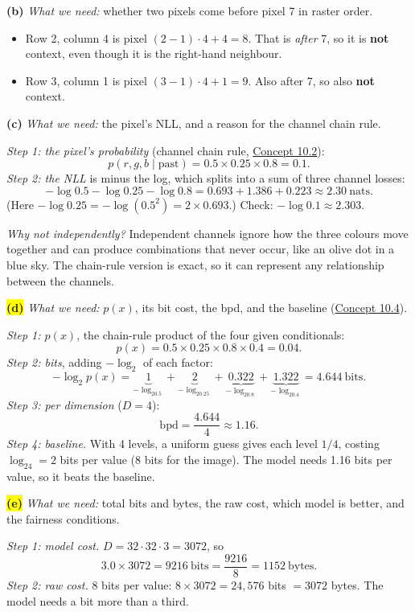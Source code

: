 \documentclass[12pt,a4paper]{article}
\begin{document}
\textbf{(b)} \emph{What we need:} whether two pixels come before pixel 7 in raster order.
\begin{itemize}[nosep]
  \item Row 2, column 4 is pixel $(2-1)\cdot4+4=8$. That is \emph{after} 7, so it is \textbf{not} context, even though it is the right-hand neighbour.
  \item Row 3, column 1 is pixel $(3-1)\cdot4+1=9$. Also after 7, so also \textbf{not} context.
\end{itemize}

\textbf{(c)} \emph{What we need:} the pixel's NLL, and a reason for the channel chain rule.

\emph{Step 1: the pixel's probability} (channel chain rule, \hyperref[c10-2]{Concept 10.2}):
\[
p(r,g,b\mid\text{past})=0.5\times0.25\times0.8=0.1 .
\]
\emph{Step 2: the NLL} is minus the log, which splits into a sum of three channel losses:
\[
-\log0.5-\log0.25-\log0.8=0.693+1.386+0.223\approx2.30\ \text{nats}.
\]
(Here $-\log0.25=-\log(0.5^2)=2\times0.693$.) Check: $-\log0.1\approx2.303$.

\emph{Why not independently?} Independent channels ignore how the three colours move together and can produce combinations that never occur, like an olive dot in a blue sky. The chain-rule version is exact, so it can represent any relationship between the channels.

\colorbox{yellow}{\textbf{(d)}} \emph{What we need:} $p(x)$, its bit cost, the bpd, and the baseline (\hyperref[c10-4]{Concept 10.4}).

\emph{Step 1: $p(x)$}, the chain-rule product of the four given conditionals:
\[
p(x)=0.5\times0.25\times0.8\times0.4=0.04 .
\]
\emph{Step 2: bits}, adding $-\log_2$ of each factor:
\[
-\log_2p(x)=\underbrace{1}_{-\log_20.5}+\underbrace{2}_{-\log_20.25}+\underbrace{0.322}_{-\log_20.8}+\underbrace{1.322}_{-\log_20.4}=4.644\ \text{bits}.
\]
\emph{Step 3: per dimension} ($D=4$):
\[
\text{bpd}=\frac{4.644}{4}\approx1.16 .
\]
\emph{Step 4: baseline.} With 4 levels, a uniform guess gives each level $1/4$, costing $\log_24=2$ bits per value (8 bits for the image). The model needs 1.16 bits per value, so it beats the baseline.

\colorbox{yellow}{\textbf{(e)}} \emph{What we need:} total bits and bytes, the raw cost, which model is better, and the fairness conditions.

\emph{Step 1: model cost.} $D=32\cdot32\cdot3=3072$, so
\[
3.0\times3072=9216\ \text{bits}=\frac{9216}{8}=1152\ \text{bytes}.
\]
\emph{Step 2: raw cost.} 8 bits per value: $8\times3072=24{,}576$ bits $=3072$ bytes. The model needs a bit more than a third.
\end{document}
